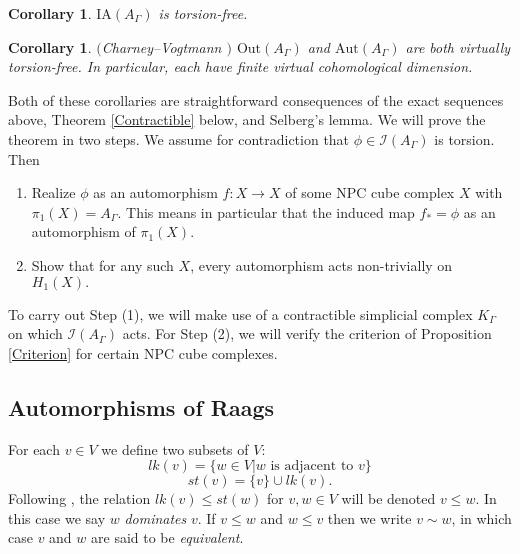 \documentclass[11pt]{amsart}
\numberwithin{thm}{section}
\newtheorem{corollary}[thm]{Corollary}
\theoremstyle{remark}
\theoremstyle{definition}
\newcommand{\Aut}{\text{Aut}}
\newcommand{\Out}{\text{Out}}
\newcommand{\IA}{\text{IA}}
\begin{document}
\begin{corollary}$\IA(A_\Gamma)$ is torsion-free.
\end{corollary}

\begin{corollary}$($Charney--Vogtmann \cite{ChVo09}$)$ $\Out(A_\Gamma)$ and $\Aut(A_\Gamma)$ are both virtually torsion-free.  In particular, each have finite virtual cohomological dimension.  
\end{corollary}
Both of these corollaries are straightforward consequences of the exact sequences above, Theorem \ref{Contractible} below, and Selberg's lemma.  
We will prove the theorem in two steps. We assume for contradiction that $\phi\in \mathcal{I}(A_\Gamma)$ is torsion.  Then 
\begin{enumerate}
\item Realize $\phi$ as an automorphism $f:X\rightarrow X$ of some NPC cube complex $X$ with $\pi_1(X)=A_\Gamma$. This means in particular that the induced map $f_*=\phi$ as an automorphism of $\pi_1(X)$. 
\item Show that for any such $X$, every automorphism acts non-trivially on $H_1(X).$
\end{enumerate}
To carry out Step (1), we will make use of a contractible simplicial complex $K_\Gamma$ on which $\mathcal{I}(A_\Gamma)$ acts.  For Step (2), we will verify the criterion of Proposition \ref{Criterion} for certain NPC cube complexes. 
\subsection{Automorphisms of Raags}

For each $v\in V$ we define two subsets of $V$: \[lk(v)=\{w\in V|w\mbox{ is adjacent to } v\}\] \[ st(v)=\{v\}\cup lk(v).\]  Following \cite{CSV12}, the relation $lk(v)\leq st(w)$ for $v,w \in V$ will be denoted $v\leq w$.  In this case we say $w$ \emph{dominates} $v$. If $v\leq w$ and $w\leq v$ then we write $v\sim w$, in which case $v$ and $w$ are said to be \emph{equivalent}.   
\end{document}
